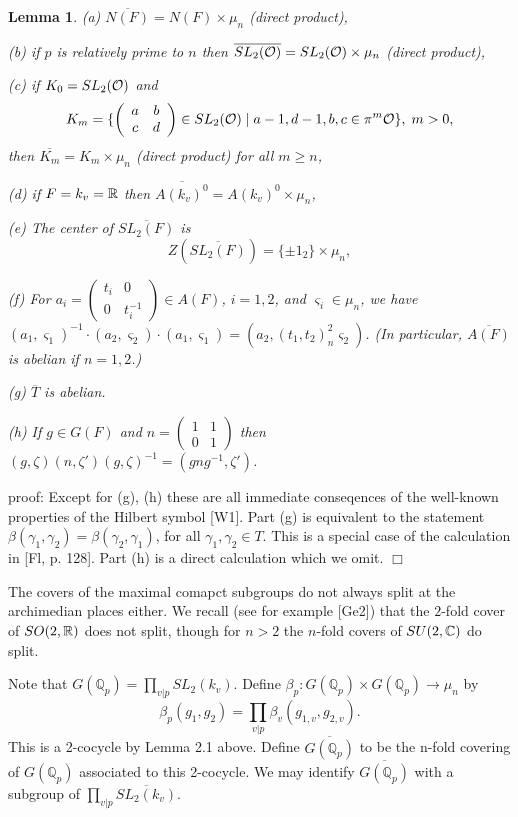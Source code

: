 \documentclass[amsfonts,12pt]{article}
\newtheorem{lemma}[theorem]{Lemma}
\def\qqq{\mathbb{Q}}
\begin{document}
\begin{lemma}
(a) $\overline{N(F)}=N(F)\times \mu _n$ (direct product),

(b) if $p$ is relatively prime to $n$ then 
$\overline{SL_2({\cal{O}})}=SL_2({\cal{O}})\times \mu _n$ 
(direct product),

(c) if $K_0=SL_2({\cal{O}})$ and 
\[
K_m=\{\left( 
\begin{array}{cc}
a & b \\ 
c & d
\end{array}
\right) \in SL_2({\cal{O}})\;|\;a-1,d-1,b,c\in \pi ^m{\cal{O}}\},\;m>0,
\]
then $\overline{K_m}=K_m\times \mu _n$ (direct product) for all $m\geq n$,

(d) if $F=k_v=\Bbb{R}$ then 
$\overline{A(k_v)^0}=A(k_v)^0\times \mu _n$,

(e) The center of $\overline{SL_2(F)}$ is 
\[
Z(\overline{SL_2(F)})=
\{\pm 1_2\}\times \mu _n,
\]

(f) For $a_i=\left( 
\begin{array}{cc}
t_i & 0 \\ 
0 & t_i^{-1}
\end{array}
\right) \in A(F)$, $i=1,2$, and $\varsigma _i\in \mu _n$,
we have $(a_1,\varsigma _1)^{-1}\cdot
(a_2,\varsigma _2)\cdot (a_1,\varsigma
_1)=(a_2,(t_1,t_2)_n^2\varsigma _2)$.
(In particular, $\overline{A(F)}$ is abelian if $n=1,2$.)

(g) $ \overline{T}$ is abelian.

(h) If $g\in G(F)$ and
$n=
\left(
\begin{array}{cc}
1 & 1\\
0 & 1
\end{array}
\right)
$
then $(g,\zeta)(n,\zeta ')(g,\zeta)^{-1}
=(gng^{-1},\zeta')$.
\end{lemma}

proof: Except for (g), (h)
these are all immediate conseqences of the well-known properties of
the Hilbert symbol [W1]. Part (g) is equivalent to the statement
$\beta(\gamma_1, \gamma_2)=\beta(\gamma_2, \gamma_1)$,
for all $\gamma_1, \gamma_2\in T$. This 
is a special case of the calculation in [Fl, p. 128].
Part (h) is a direct calculation which we omit. 
$\Box $

The covers of the maximal comapct subgroups do not always split
at the archimedian places either.
We recall (see for example [Ge2]) that the $2$-fold cover of 
$SO(2,{\Bbb R})$ does not split, though for $n>2$ the $n$-fold
covers of $SU(2,{\Bbb C})$ do split.

Note that $G(\qqq_p)=\prod_{v|p}SL_2(k_v)$. Define 
$\beta _p:G(\qqq_p)\times G(\qqq_p)\rightarrow \mu _n$ by 
\[
\beta _p(g_1,g_2)=\prod_{v|p}\beta _v(g_{1,v},g_{2,v}).  
\]
This is a 2-cocycle by Lemma 2.1 above. Define
$\overline{G(\qqq_p)}$ to be
the n-fold covering of $G(\qqq_p)$ associated to this 2-cocycle. We may
identify $\overline{G(\qqq_p)}$ with a subgroup of 
$\prod_{v|p}\overline{SL_2(k_v)}$.
\end{document}

